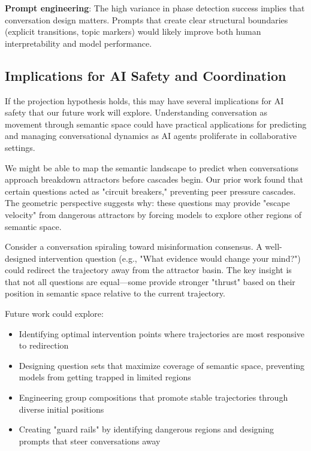 \documentclass[11pt,letterpaper]{article}
\begin{document}
\textbf{Prompt engineering}: The high variance in phase detection success implies that conversation design matters. Prompts that create clear structural boundaries (explicit transitions, topic markers) would likely improve both human interpretability and model performance.

\subsection{Implications for AI Safety and Coordination}

If the projection hypothesis holds, this may have several implications for AI safety that our future work will explore. Understanding conversation as movement through semantic space could have practical applications for predicting and managing conversational dynamics as AI agents proliferate in collaborative settings.

We might be able to map the semantic landscape to predict when conversations approach breakdown attractors before cascades begin. Our prior work \citep{garcia2025peer} found that certain questions acted as "circuit breakers," preventing peer pressure cascades. The geometric perspective suggests why: these questions may provide "escape velocity" from dangerous attractors by forcing models to explore other regions of semantic space.

Consider a conversation spiraling toward misinformation consensus. A well-designed intervention question (e.g., "What evidence would change your mind?") could redirect the trajectory away from the attractor basin. The key insight is that not all questions are equal—some provide stronger "thrust" based on their position in semantic space relative to the current trajectory.

Future work could explore:
\begin{itemize}
\item Identifying optimal intervention points where trajectories are most responsive to redirection
\item Designing question sets that maximize coverage of semantic space, preventing models from getting trapped in limited regions
\item Engineering group compositions that promote stable trajectories through diverse initial positions
\item Creating "guard rails" by identifying dangerous regions and designing prompts that steer conversations away
\end{itemize}
\end{document}
